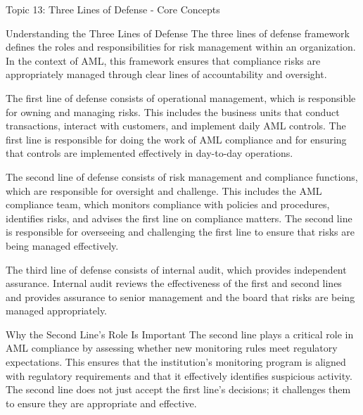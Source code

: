 \documentclass[5pt]{beamer}
\begin{document}
	\begin{frame}{Topic 13: Three Lines of Defense - Core Concepts}
		\begin{block}{\tiny Understanding the Three Lines of Defense}
			\tiny The three lines of defense framework defines the roles and responsibilities for risk management within an organization. In the context of AML, this framework ensures that compliance risks are appropriately managed through clear lines of accountability and oversight.
			
			The first line of defense consists of operational management, which is responsible for owning and managing risks. This includes the business units that conduct transactions, interact with customers, and implement daily AML controls. The first line is responsible for doing the work of AML compliance and for ensuring that controls are implemented effectively in day-to-day operations.
			
			The second line of defense consists of risk management and compliance functions, which are responsible for oversight and challenge. This includes the AML compliance team, which monitors compliance with policies and procedures, identifies risks, and advises the first line on compliance matters. The second line is responsible for overseeing and challenging the first line to ensure that risks are being managed effectively.
			
			The third line of defense consists of internal audit, which provides independent assurance. Internal audit reviews the effectiveness of the first and second lines and provides assurance to senior management and the board that risks are being managed appropriately.
		\end{block}
		
		\begin{block}{\tiny Why the Second Line's Role Is Important}
			\tiny The second line plays a critical role in AML compliance by assessing whether new monitoring rules meet regulatory expectations. This ensures that the institution's monitoring program is aligned with regulatory requirements and that it effectively identifies suspicious activity. The second line does not just accept the first line's decisions; it challenges them to ensure they are appropriate and effective.
		\end{block}
	\end{frame}
	
\end{document}
